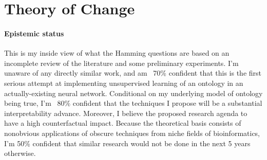 \section{Theory of Change}
\label{sec:2}
\paragraph{Epistemic status}
This is my inside view of what the Hamming questions are based on an incomplete review of the literature and some preliminary experiments.
I'm unaware of any directly similar work, and am ~70\% confident that this is the first
serious attempt at implementing unsupervised learning of an ontology 
in an actually-existing neural network.
Conditional on my underlying model of ontology being true, 
I'm ~80\% confident that the techniques I propose will be a substantial interpretability advance.
Moreover, I believe the proposed research agenda to have a high counterfactual impact.
Because the theoretical basis consists of nonobvious applications of obscure techniques from 
niche fields of bioinformatics, I'm 50\% confident that similar research would not be done in the 
next 5 years otherwise.

